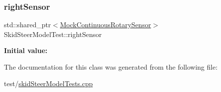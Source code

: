 \mbox{\label{classSkidSteerModelTest_a5fb5ad90e1b69276d50d288d87601e1b}} 
\subsubsection{\texorpdfstring{rightSensor}{rightSensor}}
{\footnotesize\ttfamily std\+::shared\+\_\+ptr$<$\mbox{\hyperlink{classokapi_1_1MockContinuousRotarySensor}{Mock\+Continuous\+Rotary\+Sensor}}$>$ Skid\+Steer\+Model\+Test\+::right\+Sensor}

{\bfseries Initial value\+:}
\begin{DoxyCode}{0}
\DoxyCodeLine{=}

\end{DoxyCode}


The documentation for this class was generated from the following file\+:\begin{DoxyCompactItemize}
\item 
test/\mbox{\hyperlink{skidSteerModelTests_8cpp}{skid\+Steer\+Model\+Tests.\+cpp}}\end{DoxyCompactItemize}
